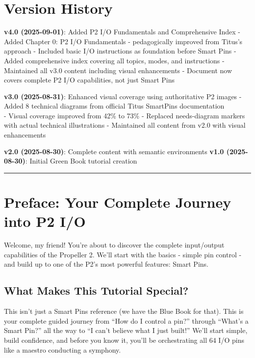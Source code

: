 \documentclass[11pt,a4paper,oneside,english]{book}
\begin{document}
\clearpage

\hypertarget{version-history}{%
\chapter{Version History}\label{version-history}}

\textbf{v4.0 (2025-09-01)}: Added P2 I/O Fundamentals and Comprehensive
Index - Added Chapter 0: P2 I/O Fundamentals - pedagogically improved
from Titus's approach - Included basic I/O instructions as foundation
before Smart Pins - Added comprehensive index covering all topics,
modes, and instructions - Maintained all v3.0 content including visual
enhancements - Document now covers complete P2 I/O capabilities, not
just Smart Pins

\textbf{v3.0 (2025-08-31)}: Enhanced visual coverage using authoritative
P2 images - Added 8 technical diagrams from official Titus SmartPins
documentation\\
- Visual coverage improved from 42\% to 73\% - Replaced needs-diagram
markers with actual technical illustrations - Maintained all content
from v2.0 with visual enhancements

\textbf{v2.0 (2025-08-30)}: Complete content with semantic environments
\textbf{v1.0 (2025-08-30)}: Initial Green Book tutorial creation

\begin{center}\rule{0.5\linewidth}{0.5pt}\end{center}

\clearpage

\hypertarget{preface-your-complete-journey-into-p2-io}{%
\chapter{Preface: Your Complete Journey into P2
I/O}\label{preface-your-complete-journey-into-p2-io}}

Welcome, my friend! You're about to discover the complete input/output
capabilities of the Propeller 2. We'll start with the basics - simple
pin control - and build up to one of the P2's most powerful features:
Smart Pins.

\hypertarget{what-makes-this-tutorial-special}{%
\section{What Makes This Tutorial
Special?}\label{what-makes-this-tutorial-special}}

This isn't just a Smart Pins reference (we have the Blue Book for that).
This is your complete guided journey from ``How do I control a pin?''
through ``What's a Smart Pin?'' all the way to ``I can't believe what I
just built!'' We'll start simple, build confidence, and before you know
it, you'll be orchestrating all 64 I/O pins like a maestro conducting a
symphony.
\end{document}
